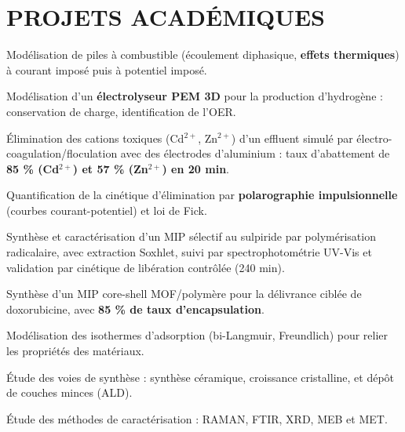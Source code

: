\documentclass[10pt]{article}
\begin{document}
\section{PROJETS ACADÉMIQUES}
\begin{bul}
\item Modélisation de piles à combustible (écoulement diphasique, \textbf{effets thermiques}) à courant imposé puis à potentiel imposé.
\item Modélisation d'un \textbf{électrolyseur PEM 3D} pour la production d'hydrogène : conservation de charge, identification de l'OER.
\end{bul}
\begin{bul}
\item Élimination des cations toxiques (Cd$^{2+}$, Zn$^{2+}$) d'un effluent simulé par électro-coagulation/floculation avec des électrodes d'aluminium : taux d'abattement de \textbf{85 \% (Cd$^{2+}$) et 57 \% (Zn$^{2+}$) en 20 min}.
\item Quantification de la cinétique d'élimination par \textbf{polarographie impulsionnelle} (courbes courant-potentiel) et loi de Fick.
\end{bul}
\begin{bul}
\item Synthèse et caractérisation d'un MIP sélectif au sulpiride par polymérisation radicalaire, avec extraction Soxhlet, suivi par spectrophotométrie UV-Vis et validation par cinétique de libération contrôlée (240 min).
\item Synthèse d'un MIP core-shell MOF/polymère pour la délivrance ciblée de doxorubicine, avec \textbf{85 \% de taux d'encapsulation}.
\item Modélisation des isothermes d'adsorption (bi-Langmuir, Freundlich) pour relier les propriétés des matériaux.
\end{bul}
\begin{bul}
\item Étude des voies de synthèse : synthèse céramique, croissance cristalline, et dépôt de couches minces (ALD).
\item Étude des méthodes de caractérisation : RAMAN, FTIR, XRD, MEB et MET.
\end{bul}
\end{document}
